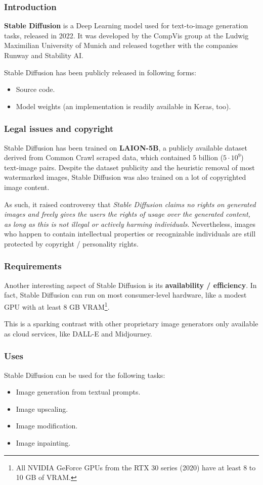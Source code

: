 \begin{frame}
    \frametitle{Introduction}
    \textbf{Stable Diffusion} is a Deep Learning model used for text-to-image generation tasks, released in 2022. It was developed by the CompVis group at the Ludwig Maximilian University of Munich and released together with the companies Runway and Stability AI.

    Stable Diffusion has been publicly released in following forms:
    \begin{itemize}
        \item Source code.
        \item Model weights (an implementation is readily available in Keras, too).
    \end{itemize}
\end{frame}

\begin{frame}
    \frametitle{Legal issues and copyright}
    Stable Diffusion has been trained on \textbf{LAION-5B}, a publicly available dataset derived from Common Crawl scraped data, which contained 5 billion ($5\cdot 10^9$) text-image pairs.
    Despite the dataset publicity and the heuristic removal of most watermarked images, Stable Diffusion was also trained on a lot of copyrighted image content.

    As such, it raised controversy that \emph{Stable Diffusion claims no rights on generated images and freely gives the users the rights of usage over the generated content, as long as this is not illegal or actively harming individuals}. Nevertheless, images who happen to contain intellectual properties or recognizable individuals are still protected by copyright / personality rights.
\end{frame}

\begin{frame}
    \frametitle{Requirements}
    Another interesting aspect of Stable Diffusion is its \textbf{availability / efficiency}. In fact, Stable Diffusion can run on most consumer-level hardware, like a modest GPU with at least 8 GB VRAM\footnote{All NVIDIA GeForce GPUs from the RTX 30 series (2020) have at least 8 to 10 GB of VRAM.}.
    
    This is a sparking contrast with other proprietary image generators only available as cloud services, like DALL-E and Midjourney.
\end{frame}

\begin{frame}
    \frametitle{Uses}
    Stable Diffusion can be used for the following tasks:
    \begin{itemize}
        \item Image generation from textual prompts.
        \item Image upscaling.
        \item Image modification.
        \item Image inpainting.
    \end{itemize}
\end{frame}


